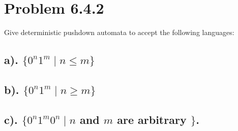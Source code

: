 \documentclass[20pt]{article} %
\begin{document}
\section{Problem 6.4.2}
Give deterministic pushdown automata to accept the following languages:
\subsection{a). $\{0^{n}1^{m} \mid n \leq m\}$}
\subsection{b). $\{0^{n}1^{m} \mid n \geq m\}$}
\subsection{c). $\{0^{n}1^{m}0^{n} \mid n$ and $m$ are arbitrary $\}$.}
\end{document}

